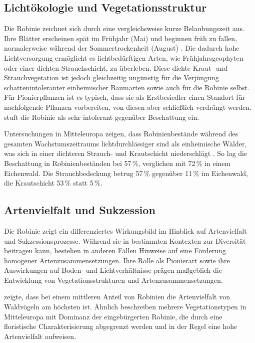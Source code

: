 \documentclass[twocolumn]{scrartcl}
\begin{document}
\subsection{Lichtökologie und Vegetationsstruktur}

Die Robinie zeichnet sich durch eine vergleichsweise kurze
Belaubungszeit aus. Ihre Blätter erscheinen spät im Frühjahr (Mai) und
beginnen früh zu fallen, normalerweise während der Sommertrockenheit
(August) \citep{vitkova2017robinie}. Die dadurch hohe Lichtversorgung
ermöglicht es lichtbedürftigen Arten, wie Frühjahrsgeophyten oder
einer dichten Strauchschicht, zu überleben. Diese dichte Kraut- und
Strauchvegetation ist jedoch gleichzeitig ungünstig für die Verjüngung
schattenintoleranter einheimischer Baumarten sowie auch für die
Robinie selbst. Für Pionierpflanzen ist es typisch, dass sie als
Erstbesiedler einen Standort für nachfolgende Pflanzen vorbereiten,
von diesen aber schließlich verdrängt
werden. \citet{baker1949schattentoleranz} stuft die Robinie als sehr
intolerant gegenüber Beschattung ein.

Untersuchungen in Mitteleuropa zeigen, dass Robinienbestände während
des gesamten Wachstumszeitraums lichtdurchlässiger sind als
einheimische Wälder, was sich in einer dichteren Strauch- und
Krautschicht niederschlägt \citep{hanzelka2015robinie}. So lag die
Beschattung in Robinienbeständen bei 57\,\%, verglichen mit 72\,\% in
einem Eichenwald. Die Strauchbedeckung betrug 57\,\% gegenüber 11\,\%
im Eichenwald, die Krautschicht 53\,\% statt 5\,\%.

\subsection{Artenvielfalt und Sukzession}

Die Robinie zeigt ein differenziertes Wirkungsbild im Hinblick auf
Artenvielfalt und Sukzessionsprozesse. Während sie in bestimmten
Kontexten zur Diversität beitragen kann, bestehen in anderen Fällen
Hinweise auf eine Förderung homogener Artenzusammensetzungen. Ihre
Rolle als Pionierart sowie ihre Auswirkungen auf Boden- und
Lichtverhältnisse prägen maßgeblich die Entwicklung von
Vegetationsstrukturen und Artenzusammensetzungen.

\citet{kraftova2017robinieVoegel} zeigte, dass bei einem mittleren
Anteil von Robinien die Artenvielfalt von Waldvögeln am höchsten
ist. Ähnlich beschreiben \citet{vitkova2010robinieVegTyp} mehrere
Vegetationstypen in Mitteleuropa mit Dominanz der eingebürgerten
Robinie, die durch eine floristische Charakterisierung abgegrenzt
werden und in der Regel eine hohe Artenvielfalt aufweisen.
\end{document}
